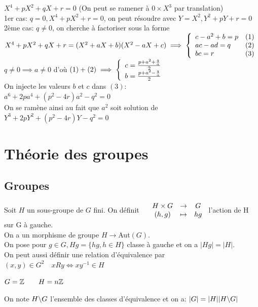 \documentclass[]{report}
\begin{document}
    \begin{center}
        $X^4+pX^2+qX+r=0$ (On peut se ramener à $0\times X^3$ par translation)\\
        1er cas: $q=0,X^4+pX^2+r=0$, on peut résoudre avec $Y=X^2,Y^2+pY+r=0$\\
        2ème cas: $q\neq 0$, on cherche à factoriser sous la forme $X^4+pX^2+qX+r=(X^2+aX+b)(X^2-aX+c)\implies \left\{\begin{array}{ll} c-a^2+b=p&(1)\\ac-ad=q&(2)\\bc=r&(3) \end{array} \right.$\\
        $q\neq0\implies a\neq0$ d'où $(1)+(2)\implies\left\{\begin{array}{ll} c=\frac{p+a^2+\frac{q}{a}}{2}\\b=\frac{p+a^2-\frac{q}{a}}{2} \end{array} \right.$\\
        On injecte les valeurs $b$ et $c$ dans $(3)$:\\
        $a^6+2pa^4+(p^2-4r)a^2-q^2=0$\\
        On se ramène ainsi au fait que $a^2$ soit solution de $Y^3+2pY^2+(p^2-4r)Y-q^2=0$
    \end{center}

    \chapter{Théorie des groupes}

    \section{Groupes}

    \begin{df}{}{}
        Soit $H$ un sous-groupe de $G$ fini. On définit $\begin{array}{ccccc} & H\times G & \to & G \\ & (h,g) & \mapsto & hg \end{array}$ l'action de H sur G à gauche.\\
        On a un morphisme de groupe $H\to$Aut$(G)$.\\
        On pose pour $g\in G,Hg=\{hg,h\in H\}$ classe à gauche et on a $|Hg|=|H|$.\\
        On peut aussi définir une relation d'équivalence par $(x,y)\in G^2\quad xRy\iff xy^{-1}\in H$
    \end{df}

    \begin{ex}{}{}
        $G=\mathbb{Z}\qquad H=n\mathbb{Z}$
    \end{ex}

    \begin{dfprop}{}{}
        On note $H\backslash G$ l'ensemble des classes d'équivalence et on a: $|G|=|H||H\backslash G|$
    \end{dfprop}
\end{document}
